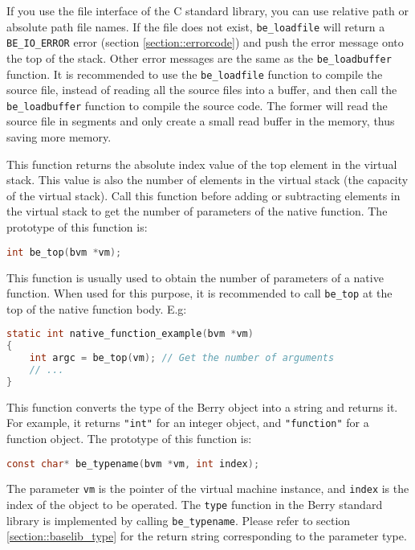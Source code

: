 If you use the file interface of the C standard library, you can use relative path or absolute path file names. If the file does not exist, \texttt{be\_loadfile} will return a \texttt{BE\_IO\_ERROR} error (section \ref{section::errorcode}) and push the error message onto the top of the stack. Other error messages are the same as the \texttt{be\_loadbuffer} function. It is recommended to use the \texttt{be\_loadfile} function to compile the source file, instead of reading all the source files into a buffer, and then call the \texttt{be\_loadbuffer} function to compile the source code. The former will read the source file in segments and only create a small read buffer in the memory, thus saving more memory.

This function returns the absolute index value of the top element in the virtual stack. This value is also the number of elements in the virtual stack (the capacity of the virtual stack). Call this function before adding or subtracting elements in the virtual stack to get the number of parameters of the native function. The prototype of this function is:
\begin{lstlisting}[language=c, style=berry, numbers=none]
int be_top(bvm *vm);
\end{lstlisting}

This function is usually used to obtain the number of parameters of a native function. When used for this purpose, it is recommended to call \texttt{be\_top} at the top of the native function body. E.g:
\begin{lstlisting}[language=c, style=berry, numbers=none]
static int native_function_example(bvm *vm)
{
    int argc = be_top(vm); // Get the number of arguments
    // ...
}
\end{lstlisting}


This function converts the type of the Berry object into a string and returns it. For example, it returns \texttt{"int"} for an integer object, and \texttt{"function"} for a function object. The prototype of this function is:
\begin{lstlisting}[language=c, style=berry, numbers=none]
const char* be_typename(bvm *vm, int index);
\end{lstlisting}
The parameter \texttt{vm} is the pointer of the virtual machine instance, and \texttt{index} is the index of the object to be operated. The \texttt{type} function in the Berry standard library is implemented by calling \texttt{be\_typename}. Please refer to section \ref{section::baselib_type} for the return string corresponding to the parameter type.

